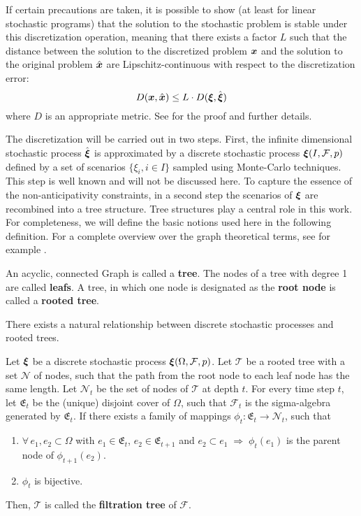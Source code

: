 If certain precautions are taken, it is possible to show (at least for linear stochastic programs) that the solution to the stochastic problem is stable under this discretization operation, meaning that there exists a factor $L$ such that the distance between the solution to the discretized problem $\boldsymbol x$ and the solution to the original problem $\hat{\boldsymbol x}$ are Lipschitz-continuous with respect to the discretization error:
\begin{equation}
  D(\boldsymbol x , \hat{\boldsymbol x}) \leq L\cdot D(\boldsymbol\xi,\hat{\boldsymbol\xi})
\end{equation}
where $D$ is an appropriate metric. See  for the proof and further details.

The discretization will be carried out in two steps.
First, the infinite dimensional stochastic process $\hat{\boldsymbol\xi}$ is approximated by a discrete stochastic process $\boldsymbol\xi(I,\mathcal{F},p)$ defined by a set of scenarios $\{\xi_i, i\in I\}$  sampled using Monte-Carlo techniques.
This step is well known and will not be discussed here.
To capture the essence of the non-anticipativity constraints, in a second step the scenarios of $\boldsymbol\xi$ are recombined into a tree structure.
Tree structures play a central role in this work.
For completeness, we will define the basic notions used here in the following definition.
For a complete overview over the graph theoretical terms, see for example .
\begin{definition}
  \label{def:tree}
  An acyclic, connected Graph is called a \textbf{tree}.
  The nodes of a tree with degree 1 are called \textbf{leafs}.
  A tree, in which one node is designated as the \textbf{root node} is called a \textbf{rooted tree}.
\end{definition}
There exists a natural relationship between discrete stochastic processes and rooted trees.
\begin{definition}
  \label{def:filtration_tree}
  Let $\boldsymbol\xi$ be a discrete stochastic process $\boldsymbol\xi(\Omega, \mathcal{F}, p)$.
  Let $\mathcal{T}$ be a rooted tree with a set $\mathcal{N}$ of nodes, such that the path from the root node to each leaf node has the same length.
  Let $\mathcal{N}_t$ be the set of nodes of $\mathcal{T}$ at depth $t$.
  For every time step $t$, let $\mathfrak{E}_t$ be the (unique) disjoint cover of $\Omega$, such that $\mathcal{F}_t$ is the sigma-algebra generated by $\mathfrak{E}_t$.
  If there exists a family of mappings $\phi_t:\mathfrak{E}_t\rightarrow \mathcal{N}_t$, such that
  \begin{enumerate}
  \item  $\forall\, e_1,e_2\subset \Omega$ with $e_1\in\mathfrak{E}_t$, $e_2\in\mathfrak{E}_{t+1}$ and $e_2\subset e_1\;\Rightarrow\;\phi_t(e_1)$ is the parent node of $\phi_{t+1}(e_2)$.
  \item $\phi_t$ is bijective.
  \end{enumerate}
  Then, $\mathcal{T}$ is called the \textbf{filtration tree} of $\mathcal{F}$.
\end{definition}
